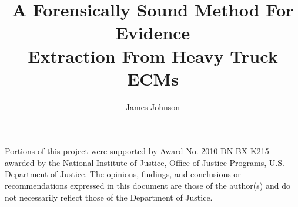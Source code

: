\documentclass[12pt,letterpaper]{report}
\newif\iftestbox
\begin{document}
\testboxfalse %

\iftestbox \testboxex \fi

%
%
\title{A Forensically Sound Method For Evidence\\
       Extraction From Heavy Truck ECMs}  %
\author{James Johnson}

%
%
\coadvisortrue  %

%
%




%
%
\thesisfalse  %

%
%

\copyrighttrue     %
\figurespagetrue   %
\tablespagetrue    %


\beforeabstract    %
\abstractp         %

%
%


\acknowledgementsp
%
%
Portions of this project were supported by Award No. 2010-DN-BX-K215 awarded by the National Institute of Justice, 
Office of Justice Programs, U.S. Department of Justice. The opinions, findings, and conclusions or recommendations 
expressed in this document are those of the author(s) and do not necessarily reflect those of the Department of Justice.
\end{document}
